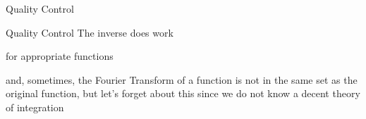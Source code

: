     \begin{frame}{Quality Control}
    \end{frame}

    \begin{frame}{Quality Control}
        \centering
        \huge{The inverse does work}

        \normalsize{for appropriate functions}

        \tiny{and, sometimes, the Fourier Transform of a function is not in the same set as the original function, but let's forget about this since we do not know a decent theory of integration}
    \end{frame}
